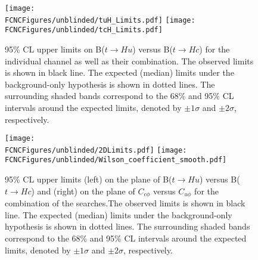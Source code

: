 \begin{figure}[htb]
\centering
\texttt{[image: \\FCNCFigures/unblinded/tuH\_Limits.pdf]}
\texttt{[image: \\FCNCFigures/unblinded/tcH\_Limits.pdf]}
\caption{95\% CL upper limits on B($t\rightarrow Hu$) versus B($t\rightarrow Hc$) for the individual channel as well as their combination. %
The observed limits is shown in black line. The expected (median) limits under the background-only hypothesis is shown in dotted lines. The surrounding shaded bands correspond to the 68\% and 95\% CL
intervals around the expected limits, denoted by $\pm1\sigma$ and $\pm2\sigma$, respectively. }
\label{fig:combined_limit}
\end{figure}


\begin{figure}[htb]
\centering
\texttt{[image: \\FCNCFigures/unblinded/2DLimits.pdf]}
\texttt{[image: \\FCNCFigures/unblinded/Wilson\_coefficient\_smooth.pdf]}
\caption{95\% CL upper limits (left) on the plane of B($t\rightarrow Hu$) versus B($t\rightarrow Hc$) and (right) on the plane of $C_{c\phi}$ versus $C_{u\phi}$ for the combination of the searches.The observed limits is shown in black line. The expected
(median) limits under the background-only hypothesis is shown in dotted lines. The surrounding shaded bands correspond to
the 68\% and 95\% CL intervals around the expected limits, denoted by $\pm1\sigma$ and $\pm2\sigma$, respectively.}
\label{fig:combined_2D_limit}
\end{figure}
